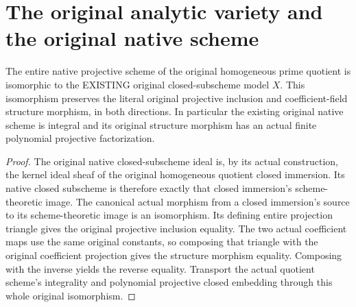 \section{The original analytic variety and the original native scheme}

\begin{theorem}
\label{thm:fc-original-variety-quotient-native-comparison}
\leanok
{}
The entire native projective scheme of the original homogeneous prime quotient
is isomorphic to the EXISTING original closed-subscheme model $X$.
This isomorphism preserves the literal original projective inclusion and
coefficient-field structure morphism, in both directions.  In particular the
existing original native scheme is integral and its original structure morphism
has an actual finite polynomial projective factorization.
\end{theorem}
\begin{proof}
The original native closed-subscheme ideal is, by its actual construction, the
kernel ideal sheaf of the original homogeneous quotient closed immersion.
Its native closed subscheme is therefore exactly that closed immersion's
scheme-theoretic image.  The canonical actual morphism from a closed immersion's
source to its scheme-theoretic image is an isomorphism.  Its defining entire
projection triangle gives the original projective inclusion equality.
The two actual coefficient maps use the same original constants, so composing
that triangle with the original coefficient projection gives the structure
morphism equality.  Composing with the inverse yields the reverse equality.
Transport the actual quotient scheme's integrality and polynomial projective
closed embedding through this whole original isomorphism.
\end{proof}

